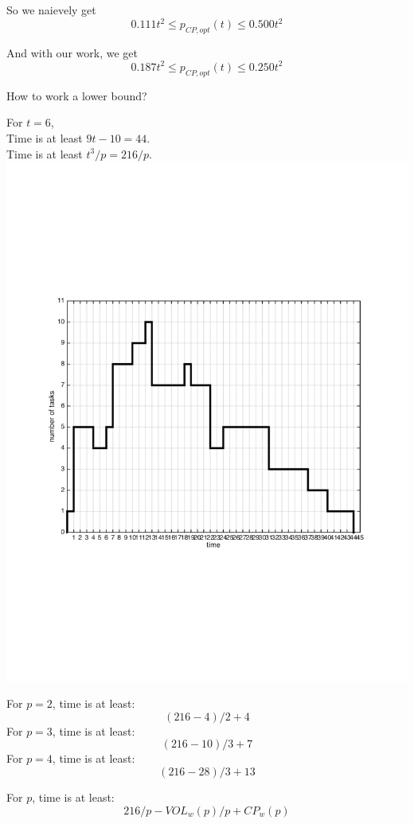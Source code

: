 \begin{frame}

So we naievely get
$$ 0.111 t^2 \leq p_{CP,opt}(t) \leq 0.500 t^2 $$

And with our work, we get
$$ 0.187 t^2 \leq p_{CP,opt}(t) \leq 0.250 t^2 $$

\end{frame}




\begin{frame}

How to work a lower bound?\\

\begin{minipage}{5cm}
For $t=6$,\\
Time is at least $9t-10 = 44$.\\
Time is at least $t^3/p = 216/p$.\\ 
\includegraphics[width=\textwidth]{dague_faverge/qqq_t6.pdf}\\
\end{minipage}
\begin{minipage}{5cm}
For $p=2$, time is at least:
$$ (216 - 4 ) / 2 + 4 $$
For $p=3$, time is at least:
$$ (216 - 10 ) / 3 + 7 $$
For $p=4$, time is at least:
$$ (216 - 28 ) / 3 + 13 $$

For $p$, time is at least:
$$ 216/p - VOL_w(p) / p + CP_w(p) $$
\end{minipage}



\end{frame}



